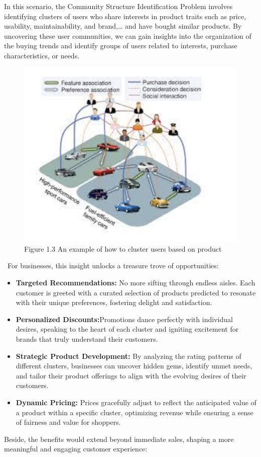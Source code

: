 In this scenario, the Community Structure Identification Problem involves identifying clusters of users who share interests in product traits such as price, usability, maintainability, and brand,… and have bought similar products.
By uncovering these user communities, we can gain insights into the organization of the buying trends and identify groups of users related to interests, purchase characteristics, or needs.
\begin{center}
\begin{figure}[!htp]
    \centering
    \includegraphics[width=1 \textwidth]{image/clustering_product_based.png}
    \caption{Figure 1.3 An example of how to cluster users based on product}
    \label{subsection}
\end{figure}
\end{center}\
For businesses, this insight unlocks a treasure trove of opportunities:

\begin{itemize}
    \item\textbf{Targeted Recommendations: }No more sifting through endless aisles. Each customer is greeted with a curated selection of products predicted to resonate with their unique preferences, fostering delight and satisfaction.
    \item\textbf{Personalized Discounts:}Promotions dance perfectly with individual desires, speaking to the heart of each cluster and igniting excitement for brands that truly understand their customers.
    \item\textbf{Strategic Product Development:} By analyzing the rating patterns of different clusters, businesses can uncover hidden gems, identify unmet needs, and tailor their product offerings to align with the evolving desires of their customers.
    \item\textbf{Dynamic Pricing:} Prices gracefully adjust to reflect the anticipated value of a product within a specific cluster, optimizing revenue while ensuring a sense of fairness and value for shoppers.
    
\end{itemize}
Beside, the benefits would extend beyond immediate sales, shaping a more meaningful and engaging customer experience:

